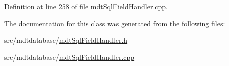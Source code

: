 Definition at line 258 of file mdt\-Sql\-Field\-Handler.\-cpp.



The documentation for this class was generated from the following files\-:\begin{DoxyCompactItemize}
\item 
src/mdtdatabase/\hyperlink{mdt_sql_field_handler_8h}{mdt\-Sql\-Field\-Handler.\-h}\item 
src/mdtdatabase/\hyperlink{mdt_sql_field_handler_8cpp}{mdt\-Sql\-Field\-Handler.\-cpp}\end{DoxyCompactItemize}
